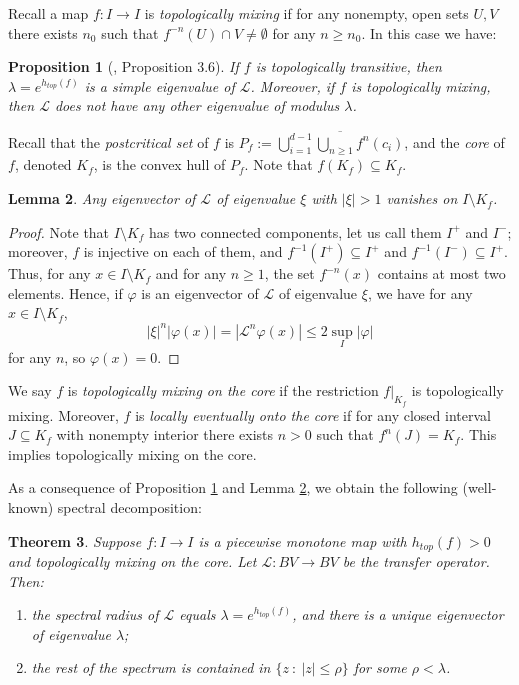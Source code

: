 \documentclass[11pt]{amsart}
\newtheorem{theorem}{Theorem}[section]
\newtheorem{lemma}[theorem]{Lemma}
\newtheorem{proposition}[theorem]{Proposition}
\begin{document}
Recall a map $f : I \to I$ is \emph{topologically mixing} if for any nonempty, open sets $U, V$ there exists $n_0$ such that $f^{-n}(U) \cap V \neq \emptyset$
for any $n \geq n_0$.
In this case we have: 
 
\begin{proposition}[\cite{Baladi-book}, Proposition 3.6] \label{P:top-trans}
If $f$ is topologically transitive, then $\lambda = e^{h_{top}(f)}$ is a simple eigenvalue of $\mathcal{L}$. 
Moreover, if $f$ is topologically mixing, then $\mathcal{L}$ does not have any other eigenvalue of modulus $\lambda$.
\end{proposition}

Recall that the \emph{postcritical set} of $f$ is  $P_f := \overline{\bigcup_{i = 1}^{d-1} \bigcup_{n \geq 1} f^n(c_i)}$, and 
the \emph{core} of $f$, denoted $K_f$, is the convex hull of $P_f$. Note that $f(K_f) \subseteq K_f$.

\begin{lemma} \label{L:nocore}
Any eigenvector of $\mathcal{L}$ of eigenvalue $\xi$ with $|\xi| > 1$ vanishes on $I \setminus K_f$. 
\end{lemma}

\begin{proof}
Note that $I \setminus K_f$ has two connected components, let us call them $I^+$ and $I^-$; moreover, $f$ is injective on each of them, and  
$f^{-1}(I^+) \subseteq I^+$ and $f^{-1}(I^-) \subseteq I^+$. 
Thus, for any $x \in I \setminus K_f$ and for any $n \geq 1$, the set $f^{-n}(x)$ contains at most two elements. 
Hence, if $\varphi$ is an eigenvector of $\mathcal{L}$ of eigenvalue $\xi$, we have for any $x \in I \setminus K_f$, 
$$|\xi|^n |\varphi(x)| = |\mathcal{L}^n \varphi(x)| \leq 2 \sup_I |\varphi|$$
for any $n$, so $\varphi(x) = 0$. 
\end{proof}

We say $f$ is \emph{topologically mixing on the core} if the restriction $f \vert_{K_f}$ is topologically mixing. 
Moreover, $f$ is \emph{locally eventually onto the core} if for any closed interval $J \subseteq K_f$ with nonempty interior
there exists $n > 0$ such that $f^n(J) = K_f$. This implies topologically mixing on the core.

As a consequence of Proposition \ref{P:top-trans} and Lemma \ref{L:nocore}, we obtain the following (well-known) spectral decomposition: 

\begin{theorem} \label{T:mixing-spectrum}
Suppose $f : I \to I$ is a piecewise monotone map with $h_{top}(f) > 0$ and topologically mixing on the core. 
Let $\mathcal{L} : BV \to BV$ be the transfer operator. Then: 
\begin{enumerate}
\item the spectral radius of $\mathcal{L}$ equals $\lambda = e^{h_{top}(f)}$, and 
there is a unique eigenvector of eigenvalue $\lambda$; 
\item the rest of the spectrum is contained in $\{ z \ : \ |z| \leq \rho \}$ for some $\rho < \lambda$.
\end{enumerate}
\end{theorem}
\end{document}
